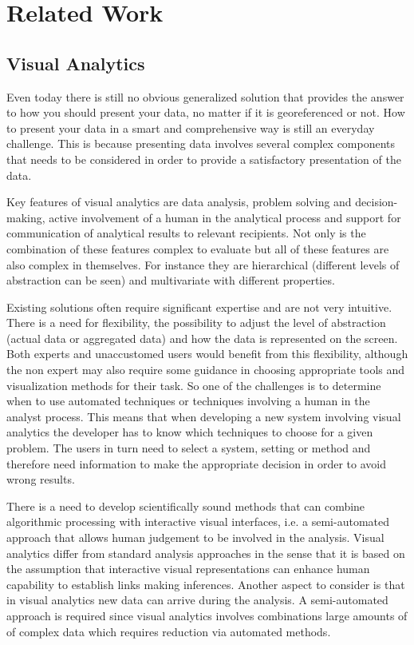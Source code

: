 \documentclass[a4paper,12pt,titlepage]{article}
\begin{document}
\section{Related Work}

\subsection{Visual Analytics}

Even today there is still no obvious generalized solution that provides the answer to how you should present your data, no matter if it is georeferenced or not. How to present your data in a smart and comprehensive way is still an everyday challenge. This is because presenting data involves several complex components that needs to be considered in order to provide a satisfactory presentation of the data. \citep{Andrienko}

Key features of visual analytics are data analysis, problem solving and decision-making, active involvement of a human in the analytical process and support for communication of analytical results to relevant recipients. Not only is the combination of these features complex to evaluate but all of these features are also complex in themselves. For instance they are hierarchical (different levels of abstraction can be seen) and multivariate with different properties. \citep {VisMaster}

Existing solutions often require significant expertise and are not very intuitive. There is a need for flexibility, the possibility to adjust the level of abstraction (actual data or aggregated data) and how the data is represented on the screen. Both experts and unaccustomed users would benefit from this flexibility, although the non expert may also require some guidance in choosing appropriate tools and visualization methods for their task. So one of the challenges is to determine when to use automated techniques or techniques involving a human in the analyst process. This means that when developing a new system involving visual analytics the developer has to know which techniques to choose for a given problem. The users in turn need to select a system, setting or method and therefore need information to make the appropriate decision in order to avoid wrong results. \citep {VisMaster}

There is a need to develop scientifically sound methods that can combine algorithmic processing with interactive visual interfaces, i.e. a semi-automated approach that allows human judgement to be involved in the analysis. Visual analytics differ from standard analysis approaches in the sense that it is based on the assumption that interactive visual representations can enhance human capability to establish links making inferences. \citep{Andrienko} Another aspect to consider is that in visual analytics new data can arrive during the analysis. A semi-automated approach is required since visual analytics involves combinations large amounts of of complex data which requires reduction via automated methods. \citep {VisMaster}
\end{document}
